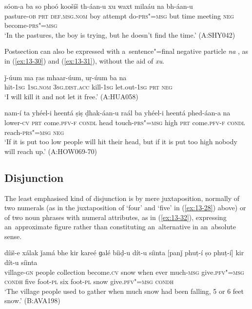 \begin{exe}
\ex
\label{ex:13-29}
\gll sóon-a ba so phoó koošíš th-áan-u xu waxt milaáu na bh-áan-u \\
pasture-\textsc{ob} \textsc{prt} \textsc{def.msg.nom} boy attempt   do-\textsc{prs"=msg} but time meeting \textsc{neg} become-\textsc{prs"=msg} \\
\glt `In the pastures, the boy is trying, but he doesn't find the time.' (A:SHY042) 
\end{exe}

 Postsection can also be expressed with a~sentence"=final negative particle \textit{na} , as in (\ref{ex:13-30}) and (\ref{ex:13-31}), without the aid of \textit{xu}. 

\begin{exe}
\ex
\label{ex:13-30}
\gll ǰ-úum ma ṛas mhaar-úum, uṛ-úum ba na \\
hit-\textsc{1sg} \textsc{1sg.nom} \textsc{3sg.dist.acc} kill-\textsc{1sg} let.out-\textsc{1sg}
\textsc{prt} \textsc{neg} \\
\glt `I will kill it and not let it free.' (A:HUA058)

\ex
\label{ex:13-31}
\gll nam-í ta yhéel-i heentá ṣiṣ ḍhak-áan-u raál ba yhéel-i heentá phed-áan-a na \\
lower-\textsc{cv} \textsc{prt} come.\textsc{pfv-f} \textsc{condl} head touch-\textsc{prs"=msg}  high \textsc{prt} come.\textsc{pfv-f} \textsc{condl} reach-\textsc{prs"=msg} \textsc{neg} \\
\glt `If it is put too low people will hit their head, but if it is put too high nobody will reach up.' (A:HOW069-70)
\end{exe}

\subsection{Disjunction}
\label{subsec:13-2-3}

 The least emphasised kind of disjunction is by mere juxtaposition, normally of two numerals (as in the juxtaposition of `four' and `five' in (\ref{ex:13-28}) above) or of two noun phrases with numeral attributes, as in (\ref{ex:13-32}), expressing an~approximate figure rather than constituting an~alternative in an~absolute sense.

\begin{exe}
\ex
\label{ex:13-32}
\gll díiš-e xálak ǰamá bhe kir kareé ɡalé bíiḍ-u dít-u síinta [panǰ phuṭ-í ṣo phuṭ-í] kir dít-u síinta \\
village-\textsc{gn} people collection become.\textsc{cv} snow  when ever much-\textsc{msg} give.\textsc{pfv"=msg} \textsc{condh} five  foot-\textsc{pl} six foot-\textsc{pl} snow give.\textsc{pfv"=msg} \textsc{condh}  \\
\glt `The village people used to gather when much snow had been falling, 5 or 6 feet snow.' (B:AVA198) 
\end{exe}

